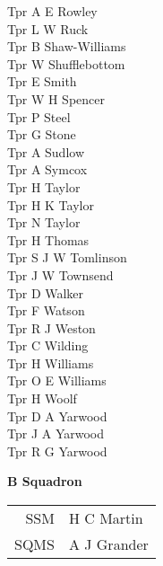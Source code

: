 \begin{multicols}{2}
  Tpr A E Rowley \\
  Tpr L W Ruck \\
  Tpr B Shaw-Williams \\
  Tpr W Shufflebottom \\
  Tpr E Smith \\
  Tpr W H Spencer \\
  Tpr P Steel \\
  Tpr G Stone \\
  Tpr A Sudlow \\
  Tpr A Symcox \\
  Tpr H Taylor \\
  Tpr H K Taylor \\
  Tpr N Taylor \\
  Tpr H Thomas \\
  Tpr S J W Tomlinson \\
  Tpr J W Townsend \\
  Tpr D Walker \\
  Tpr F Watson \\
  Tpr R J Weston \\
  Tpr C Wilding \\
  Tpr H Williams \\
  Tpr O E Williams \\
  Tpr H Woolf \\
  Tpr D A Yarwood \\
  Tpr J A Yarwood \\
  Tpr R G Yarwood \\
\end{multicols}

\begin{center}
  \Large
  \textbf{B Squadron}
\end{center}

\begin{center}
  \begin{tabular}{rl}
    SSM & H C Martin \\
    SQMS & A J Grander \\
  \end{tabular}
\end{center}

